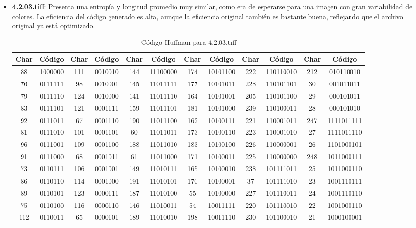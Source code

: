 \documentclass[conference,onecolumn,12pt]{IEEEtran}
\numberwithin{equation}{subsection}
\begin{document}
\begin{itemize}
    \item \textbf{4.2.03.tiff}: Presenta una entropía y longitud promedio muy similar, como era de esperarse para una imagen con gran variabilidad de colores. La eficiencia del código generado es alta, aunque la eficiencia original también es bastante buena, reflejando que el archivo original ya está optimizado.
    
    \begin{table}[H]
\centering
\caption{Código Huffman para 4.2.03.tiff}
\label{tab:huffman_4.2.03.tiff}
\begin{tabular}{cccccccccccc}
\toprule
\textbf{Char} & \textbf{Código} & \textbf{Char} & \textbf{Código} & \textbf{Char} & \textbf{Código} & \textbf{Char} & \textbf{Código} & \textbf{Char} & \textbf{Código} & \textbf{Char} & \textbf{Código} \\
\midrule
88 & 1000000 & 111 & 0010010 & 144 & 11100000 & 174 & 10101100 & 222 & 110110010 & 212 & 010110010 \\
76 & 0111111 & 98 & 0010001 & 145 & 11011111 & 177 & 10101011 & 228 & 110101101 & 30 & 001011011 \\
79 & 0111110 & 124 & 0010000 & 141 & 11011110 & 164 & 10101001 & 205 & 110101100 & 29 & 000101011 \\
83 & 0111101 & 121 & 0001111 & 159 & 11011101 & 181 & 10101000 & 239 & 110100011 & 28 & 000101010 \\
92 & 0111011 & 67 & 0001110 & 190 & 11011100 & 162 & 10100111 & 221 & 110001011 & 247 & 1111011111 \\
81 & 0111010 & 101 & 0001101 & 60 & 11011011 & 173 & 10100110 & 223 & 110001010 & 27 & 1111011110 \\
96 & 0111001 & 109 & 0001100 & 188 & 11011010 & 183 & 10100100 & 226 & 110000001 & 26 & 1101000101 \\
91 & 0111000 & 68 & 0001011 & 61 & 11011000 & 171 & 10100011 & 225 & 110000000 & 248 & 1011000111 \\
73 & 0110111 & 106 & 0001001 & 149 & 11010111 & 165 & 10100010 & 238 & 101111011 & 25 & 1011000110 \\
86 & 0110110 & 114 & 0001000 & 191 & 11010101 & 170 & 10100001 & 37 & 101111010 & 23 & 1001110111 \\
89 & 0110101 & 123 & 0000111 & 187 & 11010100 & 55 & 10100000 & 227 & 101110011 & 24 & 1001110110 \\
75 & 0110100 & 116 & 0000110 & 146 & 11010011 & 54 & 10011111 & 220 & 101110010 & 22 & 1001000110 \\
112 & 0110011 & 65 & 0000101 & 189 & 11010010 & 198 & 10011110 & 230 & 101100010 & 21 & 1000100001 \\

\end{tabular}
\end{table}
\end{itemize}
\end{document}
